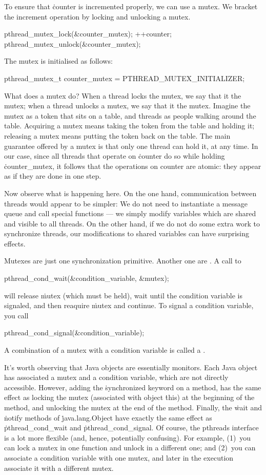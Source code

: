 To ensure that \.{counter} is incremented properly, we can use a mutex.
We bracket the increment operation by locking and unlocking a mutex.
\begin{ccode}
pthread_mutex_lock(&counter_mutex);
++counter;
pthread_mutex_unlock(&counter_mutex);
\end{ccode}
The mutex is initialised as follows:
\begin{ccode}
pthread_mutex_t counter_mutex = PTHREAD_MUTEX_INITIALIZER;
\end{ccode}
What does a mutex do?
When a thread locks the mutex, we say that it  the mutex;
when a thread unlocks a mutex, we say that it  the mutex.
Imagine the mutex as a token that sits on a table,
  and threads as people walking around the table.
Acquiring a mutex means taking the token from the table and holding it;
releasing a mutex means putting the token back on the table.
The main guarantee offered by a mutex is that only one thread can hold it,
  at any time.
In our case,
  since all threads that operate on \.{counter}
    do so while holding \.{counter\_mutex},
  it follows that the operations on counter are atomic:
  they appear as if they are done in one step.

Now observe what is happening here.
On the one hand, communication between threads would appear to be simpler:
  We do not need to instantiate a message queue and call special functions ---
    we simply modify variables which are shared and visible to all threads.
On the other hand, if we do not do some extra work to synchronize threads,
  our modifications to shared variables can have surprising effects.

Mutexes are just one synchronization primitive.
Another one are .
A call to
\begin{ccode}
pthread_cond_wait(&condition_variable, &mutex);
\end{ccode}
will release \.{mutex} (which must be held),
  wait until the condition variable is signaled,
  and then reaquire \.{mutex} and continue.
To signal a condition variable, you call
\begin{ccode}
pthread_cond_signal(&condition_variable);
\end{ccode}
A combination of a mutex with a condition variable is called a .

It's worth observing that Java objects are essentially monitors.
Each Java object has associated a mutex and a condition variable,
  which are not directly accessible.
However, adding the \.{synchronized} keyword on a method,
  has the same effect as locking the mutex (associated with object \.{this})
    at the beginning of the method,
  and unlocking the mutex at the end of the method.
Finally, the \.{wait} and \.{notify} methods of \.{java.lang.Object}
  have exactly the same effect as
    \.{pthread\_cond\_wait} and \.{pthread\_cond\_signal}.
Of course, the pthreads interface is a lot more flexible
  (and, hence, potentially confusing).
For example,
  (1)~you can lock a mutex in one function and unlock in a different one; and
  (2)~you can associate a condition variable with one mutex,
    and later in the execution associate it with a different mutex.

